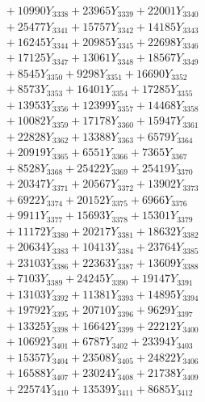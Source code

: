 \documentclass[a4paper,10pt]{article}
\begin{document}
{\begin{align}
&\;  + 10990 Y_{3338} + 23965 Y_{3339} + 22001 Y_{3340} \\[0.3ex]
&\;  + 25477 Y_{3341} + 15757 Y_{3342} + 14185 Y_{3343} \\[0.3ex]
&\;  + 16245 Y_{3344} + 20985 Y_{3345} + 22698 Y_{3346} \\[0.3ex]
&\;  + 17125 Y_{3347} + 13061 Y_{3348} + 18567 Y_{3349} \\[0.3ex]
&\;  + 8545 Y_{3350} + 9298 Y_{3351} + 16690 Y_{3352} \\[0.3ex]
&\;  + 8573 Y_{3353} + 16401 Y_{3354} + 17285 Y_{3355} \\[0.3ex]
&\;  + 13953 Y_{3356} + 12399 Y_{3357} + 14468 Y_{3358} \\[0.5ex]\allowbreak
&\;  + 10082 Y_{3359} + 17178 Y_{3360} + 15947 Y_{3361} \\[0.3ex]
&\;  + 22828 Y_{3362} + 13388 Y_{3363} + 6579 Y_{3364} \\[0.3ex]
&\;  + 20919 Y_{3365} + 6551 Y_{3366} + 7365 Y_{3367} \\[0.3ex]
&\;  + 8528 Y_{3368} + 25422 Y_{3369} + 25419 Y_{3370} \\[0.3ex]
&\;  + 20347 Y_{3371} + 20567 Y_{3372} + 13902 Y_{3373} \\[0.3ex]
&\;  + 6922 Y_{3374} + 20152 Y_{3375} + 6966 Y_{3376} \\[0.3ex]
&\;  + 9911 Y_{3377} + 15693 Y_{3378} + 15301 Y_{3379} \\[0.3ex]
&\;  + 11172 Y_{3380} + 20217 Y_{3381} + 18632 Y_{3382} \\[0.3ex]
&\;  + 20634 Y_{3383} + 10413 Y_{3384} + 23764 Y_{3385} \\[0.3ex]
&\;  + 23103 Y_{3386} + 22363 Y_{3387} + 13609 Y_{3388} \\[0.5ex]\allowbreak
&\;  + 7103 Y_{3389} + 24245 Y_{3390} + 19147 Y_{3391} \\[0.3ex]
&\;  + 13103 Y_{3392} + 11381 Y_{3393} + 14895 Y_{3394} \\[0.3ex]
&\;  + 19792 Y_{3395} + 20710 Y_{3396} + 9629 Y_{3397} \\[0.3ex]
&\;  + 13325 Y_{3398} + 16642 Y_{3399} + 22212 Y_{3400} \\[0.3ex]
&\;  + 10692 Y_{3401} + 6787 Y_{3402} + 23394 Y_{3403} \\[0.3ex]
&\;  + 15357 Y_{3404} + 23508 Y_{3405} + 24822 Y_{3406} \\[0.3ex]
&\;  + 16588 Y_{3407} + 23024 Y_{3408} + 21738 Y_{3409} \\[0.3ex]
&\;  + 22574 Y_{3410} + 13539 Y_{3411} + 8685 Y_{3412} \\[0.3ex]

\end{align}}
\end{document}
